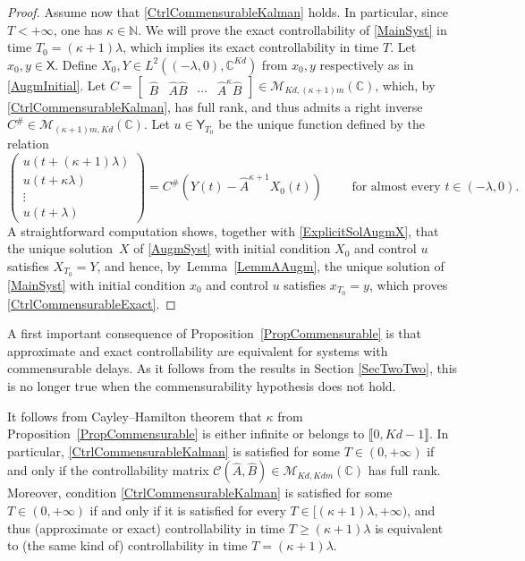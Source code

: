 \begin{proof}
Assume now that \eqref{CtrlCommensurableKalman} holds. In particular, since $T < +\infty$, one has $\kappa \in \mathbb N$. We will prove the exact controllability of \eqref{MainSyst} in time $T_0 = (\kappa + 1)\lambda$, which implies its exact controllability in time $T$. Let $x_0, y \in \mathsf X$. Define $X_0, Y \in L^2((-\lambda, 0), \mathbb C^{Kd})$ from $x_0, y$ respectively as in \eqref{AugmInitial}. Let $C = \begin{bmatrix}\widehat B & \widehat A \widehat B & \cdots & \widehat A^\kappa \widehat B\end{bmatrix} \in \mathcal M_{Kd, (\kappa + 1) m}(\mathbb C)$, which, by \eqref{CtrlCommensurableKalman}, has full rank, and thus admits a right inverse $C^\# \in \mathcal M_{(\kappa + 1) m, Kd}(\mathbb C)$. Let $u \in \mathsf Y_{T_0}$ be the unique function defined by the relation
\[
\begin{pmatrix}
u(t + (\kappa + 1)\lambda) \\
u(t + \kappa \lambda) \\
\vdots \\
u(t + \lambda)
\end{pmatrix} = C^\# \left(Y(t) - \widehat A^{\kappa + 1} X_0(t)\right) \qquad \text{ for almost every } t \in (-\lambda, 0).
\]
A straightforward computation shows, together with \eqref{ExplicitSolAugmX}, that the unique solution~$X$ of \eqref{AugmSyst} with initial condition $X_0$ and control $u$ satisfies $X_{T_0} = Y$, and hence, by~Lemma~\ref{LemmAAugm}, the unique solution of \eqref{MainSyst} with initial condition $x_0$ and control $u$ satisfies $x_{T_0} = y$, which proves \eqref{CtrlCommensurableExact}.
\end{proof}

\begin{remk}
A first important consequence of Proposition~\ref{PropCommensurable} is that approximate and exact controllability are equivalent for systems with commensurable delays. As it follows from the results in Section \ref{SecTwoTwo}, this is no longer true when the commensurability hypothesis does not hold.
\end{remk}

\begin{remk}
\label{RemkCayleyHamilton}
It follows from Cayley--Hamilton theorem that $\kappa$ from Proposition~\ref{PropCommensurable} is either infinite or belongs to $\llbracket 0, Kd - 1\rrbracket$. In particular, \eqref{CtrlCommensurableKalman} is satisfied for some $T \in (0, +\infty)$ if and only if the controllability matrix $\mathcal C(\widehat A, \widehat B) \in \mathcal M_{Kd, Kdm}(\mathbb C)$ has full rank. Moreover, condition \eqref{CtrlCommensurableKalman} is satisfied for some $T \in (0, +\infty)$ if and only if it is satisfied for every $T \in [(\kappa + 1) \lambda, +\infty)$, and thus (approximate or exact) controllability in time $T \geq (\kappa + 1) \lambda$ is equivalent to (the same kind of) controllability in time $T = (\kappa + 1)\lambda$.
\end{remk}

